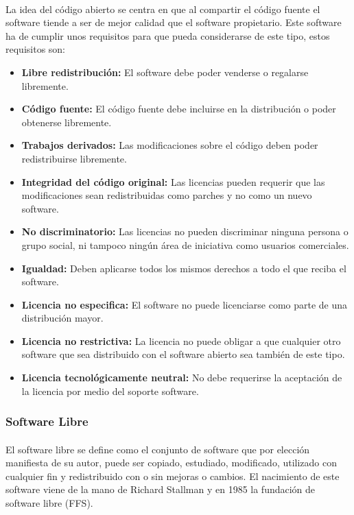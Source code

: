 \documentclass[10pt]{article}
\begin{document}
            \paragraph{}
            La idea del código abierto se centra en que al compartir el código fuente el software tiende a ser de mejor calidad que el software propietario. Este software ha de cumplir unos requisitos para que pueda considerarse de este tipo, estos requisitos son:
            \begin{itemize}
            \item \textbf{Libre redistribución:} El software debe poder venderse o regalarse libremente.
            \item \textbf{Código fuente:} El código fuente debe incluirse en la distribución o poder obtenerse libremente.
            \item \textbf{Trabajos derivados:} Las modificaciones sobre el código deben poder redistribuirse libremente.
            \item \textbf{Integridad del código original:} Las licencias pueden requerir que las modificaciones sean redistribuidas como parches y no como un nuevo software.
            \item \textbf{No discriminatorio:} Las licencias no pueden discriminar ninguna persona o grupo social, ni tampoco ningún área de iniciativa como usuarios comerciales.
            \item \textbf{Igualdad:} Deben aplicarse todos los mismos derechos a todo el que reciba el software.
            \item \textbf{Licencia no especifica:} El software no puede licenciarse como parte de una distribución mayor.
            \item \textbf{Licencia no restrictiva:} La licencia no puede obligar a que cualquier otro software que sea distribuido con el software abierto sea también de este tipo.
            \item \textbf{Licencia tecnológicamente neutral:} No debe requerirse la aceptación de la licencia por medio del soporte software.
            \end{itemize}
            
            \subsubsection{Software Libre}
            \paragraph{}
            El software libre se define como el conjunto de software que por elección manifiesta de su autor, puede ser copiado, estudiado, modificado, utilizado con cualquier fin y redistribuido con o sin mejoras o cambios. El nacimiento de este software viene de la mano de Richard Stallman y en 1985 la fundación de software libre (FFS).\cite{Wikipedia:SoftwareLibre}
            
\end{document}
